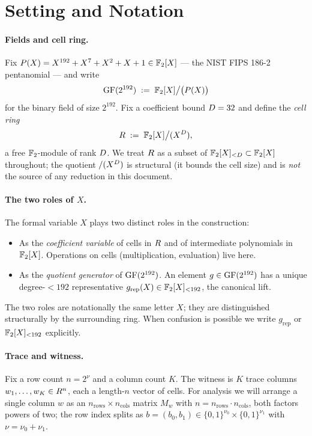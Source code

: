 \section{Setting and Notation}
\label{sec:setting}

\paragraph{Fields and cell ring.} Fix
$P(X) = X^{192} + X^7 + X^2 + X + 1 \in \mathbb{F}_2[X]$ — the NIST FIPS 186-2
pentanomial — and write
\[
  \mathrm{GF}(2^{192}) \;:=\; \mathbb{F}_2[X] \big/ \bigl(P(X)\bigr)
\]
for the binary field of size $2^{192}$. Fix a coefficient bound
$D = 32$ and define the \emph{cell ring}
\[
  R \;:=\; \mathbb{F}_2[X]\big/(X^{D}),
\]
a free $\mathbb{F}_2$-module of rank $D$. We treat $R$ as a
subset of $\mathbb{F}_2[X]_{<D} \subset \mathbb{F}_2[X]$ throughout; the
quotient $/(X^D)$ is structural (it bounds the cell size) and is
\emph{not} the source of any reduction in this document.

\paragraph{The two roles of $X$.} The formal variable $X$ plays two
distinct roles in the construction:
\begin{itemize}[leftmargin=2em]
  \item As the \emph{coefficient variable} of cells in $R$
    and of intermediate polynomials in $\mathbb{F}_2[X]$. Operations on
    cells (multiplication, evaluation) live here.
  \item As the \emph{quotient generator} of $\mathrm{GF}(2^{192})$. An element
    $g \in \mathrm{GF}(2^{192})$ has a unique degree-$<192$ representative
    $g_{\mathrm{rep}}(X) \in \mathbb{F}_2[X]_{<192}$, the canonical lift.
\end{itemize}
The two roles are notationally the same letter $X$; they are
distinguished structurally by the surrounding ring. When confusion is
possible we write $g_{\mathrm{rep}}$ or $\mathbb{F}_2[X]_{<192}$ explicitly.

\paragraph{Trace and witness.} Fix a row count $n = 2^{\nu}$ and a
column count $K$. The witness is $K$ trace columns
$w_1, \ldots, w_K \in R^n$, each a length-$n$ vector of cells.
For analysis we will arrange a single column $w$ as an
$n_{\mathrm{rows}} \times n_{\mathrm{cols}}$ matrix
$M_w$ with $n = n_{\mathrm{rows}} \cdot n_{\mathrm{cols}}$, both
factors powers of two; the row index splits as
$b = (b_0, b_1) \in \{0,1\}^{\nu_0} \times \{0,1\}^{\nu_1}$ with
$\nu = \nu_0 + \nu_1$.

